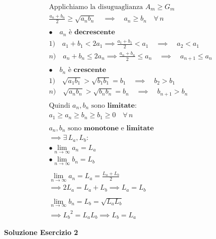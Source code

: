 \documentclass[11pt,reqno]{amsart}
\begin{document}
\begin{gather*}
  \text{Applichiamo la disuguaglianza } A_m \geq G_m\\
  \frac{a_n + b_n}{2} \geq \sqrt{a_{n}b_n} \quad \implies \quad a_n \geq b_n \quad \forall \, n\\\\
  \bullet \quad a_n\text{ è}\textbf{ decrescente}\\
  1) \quad a_1 + b_1 < 2a_1 \implies \frac{a_1 + b_1}{2} < a_1 \quad \implies \quad a_2 < a_1\\
  n) \quad a_n + b_n \leq 2a_n \implies \frac{a_n + b_n}{2} \leq a_n \quad \implies \quad a_{n+1} \leq a_n\\\\
  \bullet \quad b_n\text{ è}\textbf{ crescente}\\
  1) \quad \sqrt{a_{1}b_1} > \sqrt{b_{1}b_1} = b_1 \quad \implies \quad b_2 > b_1\\
  n) \quad \sqrt{a_{n}b_n} > \sqrt{b_{n}b_n} = b_n \quad \implies \quad b_{n+1} > b_n\\\\
  \text{Quindi } a_n, b_n \text{ sono } \textbf{limitate}:\\
  a_1 \geq a_n \geq b_n \geq b_1 \geq 0 \quad \forall \, n\\\\
  a_n, b_n \text{ sono } \textbf{monotone} \text{ e } \textbf{limitate}\\
  \implies \exists \, L_a, L_b :\\
  \bullet \lim_{n \to \infty} a_n = L_a\\
  \bullet \lim_{n \to \infty} b_n = L_b\\\\
  \lim_{n \to \infty} a_n = L_a = \frac{L_a + L_b}{2}\\
  \implies 2L_a = L_a + L_b \implies L_a = L_b\\\\
  \lim_{n \to \infty} b_n = L_b = \sqrt{L_{a}L_b}\\
  \implies {L_b}^2 = L_{a}L_b \implies L_b = L_a
\end{gather*}

\newpage
\centerline{\bf Soluzione Esercizio 2 }
\bigskip
\end{document}
